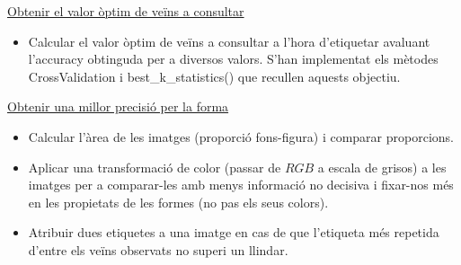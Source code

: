 \documentclass[a4paper, 11pt]{article}
\begin{document}
\underline{Obtenir el valor òptim de veïns a consultar}
\begin{itemize}
    \item Calcular el valor òptim de veïns a consultar a l'hora d'etiquetar avaluant l'accuracy obtinguda per a diversos valors. S'han implementat els mètodes \textcolor{funcblue}{CrossValidation} i \textcolor{funcblue}{best\_k\_statistics()} que recullen aquests objectiu.
\end{itemize}
\underline{Obtenir una millor precisió per la forma}\label{dosetiquetes}
\begin{itemize}
    \item Calcular l'àrea de les imatges (proporció fons-figura) i comparar proporcions.
    \item Aplicar una transformació de color (passar de $RGB$ a escala de grisos) a les imatges per a comparar-les amb menys informació no decisiva i fixar-nos més en les propietats de les formes (no pas els seus colors). 
    \item Atribuir dues etiquetes a una imatge en cas de que l'etiqueta més repetida d'entre els veïns observats no superi un llindar.
\end{itemize}
\newpage
\end{document}
